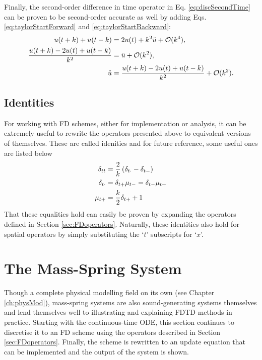 Finally, the second-order difference in time operator in Eq. \eqref{eq:discSecondTime} can be proven to be second-order accurate as well by adding Eqs. \eqref{eq:taylorStartForward} and \eqref{eq:taylorStartBackward}:
\begin{align}
    u(t+k) + u(t-k) &= 2 u(t) + k^2 \ddot u + \mathcal{O}(k^4),\nonumber\\
    \frac{u(t+k) -2 u(t) + u(t-k)}{k^2} &= \ddot u + \mathcal{O}(k^2),\nonumber\\
    \ddot u &= \frac{u(t+k) -2 u(t) + u(t-k)}{k^2} + \mathcal{O}(k^2).
\end{align}

\subsection{Identities}
For working with FD schemes, either for implementation or analysis, it can be extremely useful to rewrite the operators presented above to equivalent versions of themselves. These are called idenities and for future reference, some useful ones are listed below
\begin{subequations}
    \begin{align}
        \delta_{tt} &= \frac{2}{k}\left(\delta_{t\cdot}- \delta_{t-}\right)\label{eq:identity1}\\
        \delta_{t\cdot} &= \delta_{t+}\mu_{t-} = \delta_{t-}\mu_{t+}\label{eq:identity2}\\
        \mu_{t+} &= \frac{k}{2}\delta_{t+} + 1\label{eq:identity3}
    \end{align}
\end{subequations}
That these equalities hold can easily be proven by expanding the operators defined in Section \ref{sec:FDoperators}. Naturally, these identities also hold for spatial operators by simply substituting the `$t$' subscripts for `$x$'. 

\section{%
The Mass-Spring System}\label{sec:massSpringSystem}
Though a complete physical modelling field on its own (see Chapter \ref{ch:physMod}), mass-spring systems are also sound-generating systems themselves and lend themselves well to illustrating and explaining FDTD methods in practice. Starting with the continuous-time ODE, this section continues to discretise it to an FD scheme using the operators described in Section \ref{sec:FDoperators}. Finally, the scheme is rewritten to an update equation that can be implemented and the output of the system is shown. 

